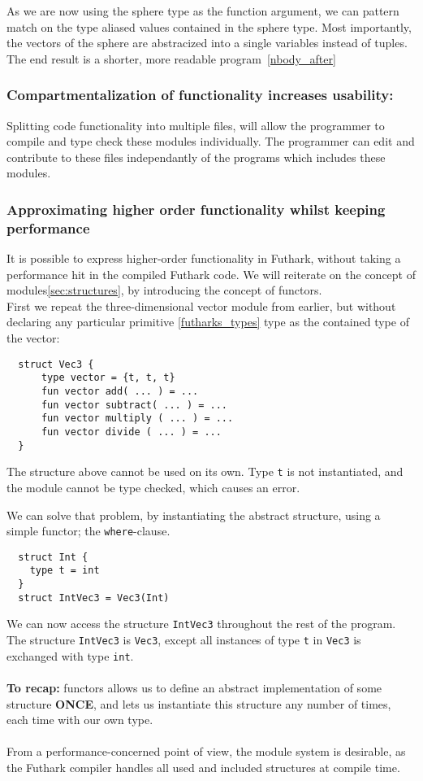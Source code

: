 \noindent As we are now using the sphere type as the function argument, we can pattern
match on the type aliased values contained in the sphere type.
Most importantly, the vectors of the sphere are abstracized into a single variables
instead of tuples.
\\
The end result is a shorter, more readable program~\ref{nbody_after}

\subsubsection{Compartmentalization of functionality increases usability:}
Splitting code functionality into multiple files, will allow the programmer to
compile and type check these modules individually. The programmer can edit and
contribute to these files independantly of the programs which includes these
modules.

\subsubsection{Approximating higher order functionality whilst keeping performance}
\label{subsec:higherorderfunctionality}
It is possible to express higher-order functionality in Futhark, without taking
a performance hit in the compiled Futhark code.
We will reiterate on the concept of modules\ref{sec:structures}, by introducing
the concept of functors.\\
First we repeat the three-dimensional vector module
from earlier, but without declaring any particular
primitive \ref{futharks_types} type as the contained type of the vector:
\begin{verbatim}
  struct Vec3 {
      type vector = {t, t, t}
      fun vector add( ... ) = ...
      fun vector subtract( ... ) = ...
      fun vector multiply ( ... ) = ...
      fun vector divide ( ... ) = ...
  }
\end{verbatim}
\noindent
The structure above cannot be used on its own. Type \texttt{t} is not
instantiated, and the module cannot be type checked, which causes an error.

\noindent
We can solve that problem, by instantiating the abstract structure, using a
simple functor; the \texttt{where}-clause.
\label{first_functor_example}
\begin{verbatim}
  struct Int {
    type t = int 
  }
  struct IntVec3 = Vec3(Int)
\end{verbatim}
\noindent
We can now access the structure \texttt{IntVec3} throughout the rest of the
program.
\\
The structure \texttt{IntVec3} is \texttt{Vec3}, except all instances
of type \texttt{t} in \texttt{Vec3} is exchanged with type \texttt{int}.
\\
\\
\textbf{To recap:} functors allows us to define an abstract implementation of some
structure \textbf{ONCE}, and lets us instantiate this structure any number of
times, each time with our own type.
\\
\\
From a performance-concerned point of view, the module system is desirable, as the Futhark compiler handles all used and included structures at compile time.
